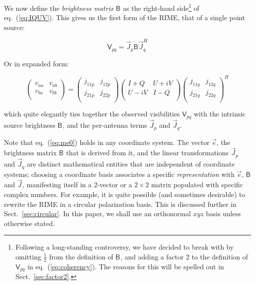 \documentclass[]{aa}
\newcommand{\herm}{H}
\newcommand{\jones}[2]{\vec {#1}_{#2}}
\newcommand{\jonesT}[2]{\vec {#1}^{\herm}_{#2}}
\newcommand{\coh}[2]{\mathsf{{#1}}_{{#2}}}
\begin{document}
We now define the {\em brightness matrix} $\coh{B}{}$ as the right-hand side\footnote{Following a long-standing controversy, we have decided to break with \citet{ME4} by omitting $\frac{1}{2}$ from the definition of $\coh{B}{}$, and adding a factor 2 to the definition of $\coh{V}{pq}$ in eq.~(\ref{eq:coherency}). The reasons for this will be spelled out in Sect.~\ref{sec:factor2}.} of eq.~(\ref{eq:IQUV}). This gives us the first form of the RIME, that of a single point source:

    \begin{equation}\label{eq:me0}
    \coh{V}{pq} = \jones{J}{p} \coh{B}{}  \jonesT{J}{q}
    \end{equation}

Or in expanded form:

\[
    \left( 
    \begin{array}{cc}
    v_{aa} & v_{ab} \\
    v_{ba} & v_{bb} \\
    \end{array}
    \right) = 
    \left( 
    \begin{array}{cc}
    j_{11p} & j_{12p} \\
    j_{21p} & j_{22p} \\
    \end{array}
    \right) 
    \left( 
    \begin{array}{cc}
    I+Q & U+iV \\
    U-iV & I-Q \\
    \end{array}
    \right) 
    \left( 
    \begin{array}{cc}
    j_{11q} & j_{12q} \\
    j_{21q} & j_{22q} \\
    \end{array}
    \right)^\herm
\]

which quite elegantly ties together the observed visibilities $\coh{V}{pq}$ with the intrinsic source brightness $\coh{B}{}$, and the per-antenna terms $\jones{J}{p}$ and $\jones{J}{q}$.

Note that eq.~(\ref{eq:me0}) holds in any coordinate system. The vector $\vec e$, the brightness matrix $\coh{B}{}$ that is derived from it, and the linear transformations $\jones{J}{p}$ and $\jones{J}{q}$ are distinct mathematical entities that are independent of coordinate systems; choosing a coordinate basis associates a specific {\em representation} with $\vec e$,  $\coh{B}{}$ and $\jones{J}{}$, manifesting itself in a 2-vector or a $2\times2$ matrix populated with specific complex numbers. For example, it is quite possible (and sometimes desirable) to rewrite the RIME in a circular polarization basis. This is discussed further in Sect.~\ref{sec:circular}. In this paper, we shall use an orthonormal $xyz$ basis unless otherwise stated.
\end{document}
